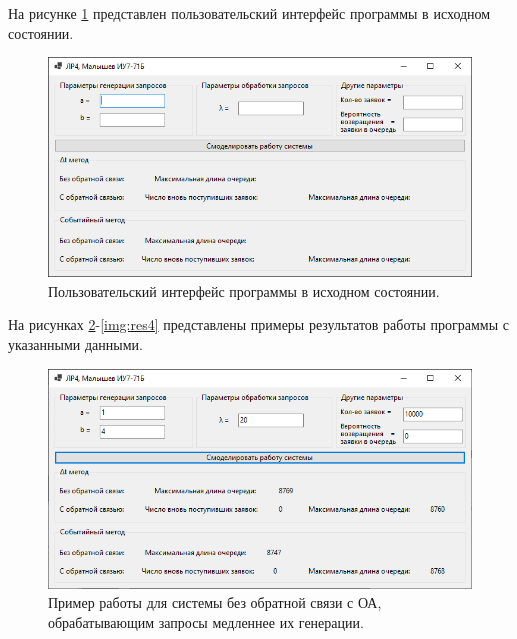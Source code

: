 \documentclass[14pt]{extreport}
\begin{document}
На рисунке \ref{img:ui} представлен пользовательский интерфейс программы в исходном состоянии.

\begin{figure}[H]
	\begin{center}
		\includegraphics[scale=0.8]{imgs/ui.png}
	\end{center}
	\caption{Пользовательский интерфейс программы в исходном состоянии.}
	\label{img:ui}
\end{figure}

На рисунках \ref{img:res1}-\ref{img:res4} представлены примеры результатов работы программы с указанными данными.

\begin{figure}[H]
	\begin{center}
		\includegraphics[scale=0.8]{imgs/res1.png}
	\end{center}
	\caption{Пример работы для системы без обратной связи с ОА, обрабатывающим запросы медленнее их генерации.}
	\label{img:res1}
\end{figure}
\end{document}
